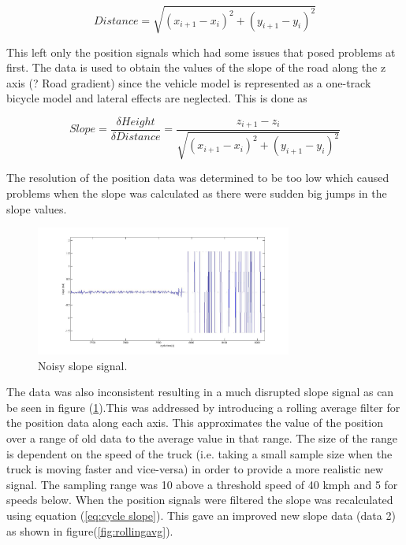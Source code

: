 \documentclass[ExampleMasters.tex]{subfiles}
\begin{document}
\begin{equation} \label{eq:cycle distance}
Distance = \sqrt{(x_{i+1} - x_i)^2 +(y_{i+1} - y_i)^2}
\end{equation}

This left only the position signals which had some issues that posed problems at first. The data is used to obtain the values of the slope of the road along the z axis (? Road gradient) since the vehicle model is represented as a one-track bicycle model and lateral effects are neglected. This is done as 

\begin{equation} \label{eq:cycle slope}
Slope =\frac{\delta Height}{\delta Distance} = \frac{z_{i+1} - z_i}{\sqrt{(x_{i+1}-x_i)^2 +(y_{i+1}-y_i)^2  }}
\end{equation}

The resolution of the position data was determined to be too low which caused problems when the slope was calculated as there were sudden big jumps in the slope values.

\begin{figure}[hb]
	\begin{center}
		\includegraphics[width=0.75\textwidth]{figures/VehicleModel/noise.jpg}
	\end{center}
	\caption{Noisy slope signal.}
	\label{fig:noise}
\end{figure}

The data was also inconsistent resulting in a much disrupted slope signal as can be seen in figure (\ref{fig:noise}).This was addressed by introducing a rolling average filter for the position data along each axis. This approximates the value of the position over a range of old data to the average value in that range. The size of the range is dependent on the speed of the truck (i.e. taking a small sample size when the truck is moving faster and vice-versa) in order to provide a more realistic new signal. The sampling range was 10 above a threshold speed of 40 kmph and 5 for speeds below. When the position signals were filtered the slope was recalculated using equation (\ref{eq:cycle slope}). This gave an improved new slope data (data 2) as shown in figure(\ref{fig:rollingavg}).
\end{document}

